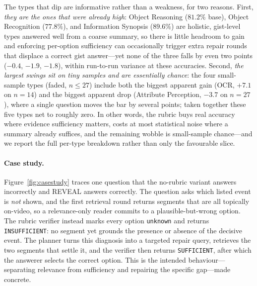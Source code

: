 \documentclass[letterpaper]{article} %
\begin{document}
The types that dip are informative rather than a weakness, for two reasons. First, \emph{they are the ones that were already high}: Object Reasoning ($81.2\%$ base), Object Recognition ($77.8\%$), and Information Synopsis ($89.6\%$) are holistic, gist-level types answered well from a coarse summary, so there is little headroom to gain and enforcing per-option sufficiency can occasionally trigger extra repair rounds that displace a correct gist answer---yet none of the three falls by even two points ($-0.4$, $-1.9$, $-1.8$), within run-to-run variance at these accuracies. Second, \emph{the largest swings sit on tiny samples and are essentially chance}: the four small-sample types (faded, $n\!\le\!27$) include both the biggest apparent gain (OCR, $+7.1$ on $n\!=\!14$) and the biggest apparent drop (Attribute Perception, $-3.7$ on $n\!=\!27$), where a single question moves the bar by several points; taken together these five types net to roughly zero. In other words, the rubric buys real accuracy where evidence sufficiency matters, costs at most statistical noise where a summary already suffices, and the remaining wobble is small-sample chance---and we report the full per-type breakdown rather than only the favourable slice.

\paragraph{Case study.}
Figure~\ref{fig:casestudy} traces one question that the no-rubric variant answers incorrectly and REVEAL answers correctly. The question asks which listed event is \emph{not} shown, and the first retrieval round returns segments that are all topically on-video, so a relevance-only reader commits to a plausible-but-wrong option. The rubric verifier instead marks every option \texttt{unknown} and returns \texttt{INSUFFICIENT}: no segment yet grounds the presence or absence of the decisive event. The planner turns this diagnosis into a targeted repair query, retrieves the two segments that settle it, and the verifier then returns \texttt{SUFFICIENT}, after which the answerer selects the correct option. This is the intended behaviour---separating relevance from sufficiency and repairing the specific gap---made concrete.
\end{document}

